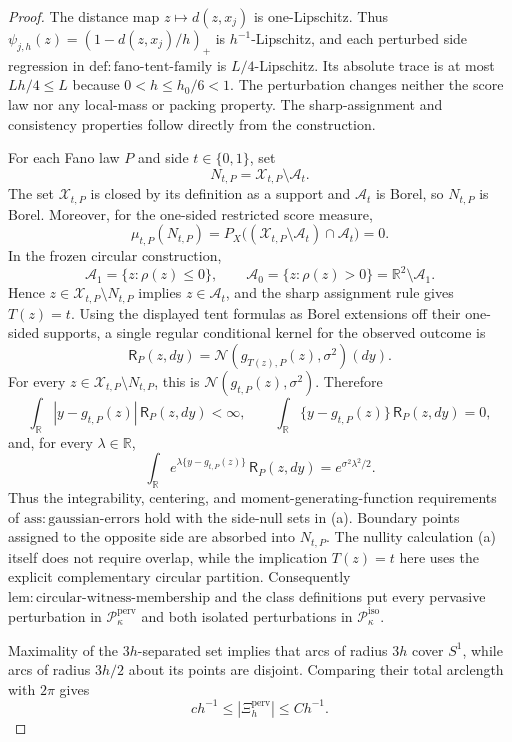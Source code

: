 \documentclass{article}
\begin{document}
\begin{proof}
The distance map \(z\mapsto d(z,x_j)\) is one-Lipschitz. Thus \(\psi_{j,h}(z)=(1-d(z,x_j)/h)_+\) is \(h^{-1}\)-Lipschitz, and each perturbed side regression in \(\mathrm{def:fano\text{-}tent\text{-}family}\) is \(L/4\)-Lipschitz. Its absolute trace is at most \(Lh/4\le L\) because \(0<h\le h_0/6<1\). The perturbation changes neither the score law nor any local-mass or packing property. The sharp-assignment and consistency properties follow directly from the construction.

For each Fano law \(P\) and side \(t\in\{0,1\}\), set
\[
 N_{t,P}=\mathcal X_{t,P}\setminus\mathcal A_t.
\]
The set \(\mathcal X_{t,P}\) is closed by its definition as a support and
\(\mathcal A_t\) is Borel, so \(N_{t,P}\) is Borel.  Moreover, for the
one-sided restricted score measure,
\[
 \mu_{t,P}(N_{t,P})
 =P_X\bigl((\mathcal X_{t,P}\setminus\mathcal A_t)
             \cap\mathcal A_t\bigr)=0. \tag{a}
\]
In the frozen circular construction,
\[
 \mathcal A_1=\{z:\rho(z)\le0\},
 \qquad
 \mathcal A_0=\{z:\rho(z)>0\}
 =\mathbb R^2\setminus\mathcal A_1.
\]
Hence \(z\in\mathcal X_{t,P}\setminus N_{t,P}\) implies
\(z\in\mathcal A_t\), and the sharp assignment rule gives \(T(z)=t\).
Using the displayed tent formulas as Borel extensions off their
one-sided supports, a single regular conditional kernel for the
observed outcome is
\[
 \mathsf R_P(z,dy)
 =\mathcal N(g_{T(z),P}(z),\sigma^2)(dy).
\]
For every \(z\in\mathcal X_{t,P}\setminus N_{t,P}\), this is
\(\mathcal N(g_{t,P}(z),\sigma^2)\).  Therefore
\[
 \int_{\mathbb R}|y-g_{t,P}(z)|\,\mathsf R_P(z,dy)<\infty,
 \qquad
 \int_{\mathbb R}\{y-g_{t,P}(z)\}\,\mathsf R_P(z,dy)=0,
\]
and, for every \(\lambda\in\mathbb R\),
\[
 \int_{\mathbb R}e^{\lambda\{y-g_{t,P}(z)\}}
 \,\mathsf R_P(z,dy)
 =e^{\sigma^2\lambda^2/2}.
\]
Thus the integrability, centering, and moment-generating-function
requirements of \(\mathrm{ass:gaussian\text{-}errors}\) hold with the
side-null sets in (a).  Boundary points assigned to the opposite side
are absorbed into \(N_{t,P}\).  The nullity calculation (a) itself does
not require overlap, while the implication \(T(z)=t\) here uses the
explicit complementary circular partition.  Consequently
\(\mathrm{lem:circular\text{-}witness\text{-}membership}\) and the class
definitions put every pervasive perturbation in
\(\mathcal P_{\kappa}^{\mathrm{perv}}\) and both isolated perturbations in
\(\mathcal P_{\kappa}^{\mathrm{iso}}\).

Maximality of the \(3h\)-separated set implies that arcs of radius \(3h\) cover \(S^1\), while arcs of radius \(3h/2\) about its points are disjoint. Comparing their total arclength with \(2\pi\) gives
\[
 c h^{-1}\le |\Xi_h^{\mathrm{perv}}|\le C h^{-1}. \tag{7}
\]


\end{proof}
\end{document}

